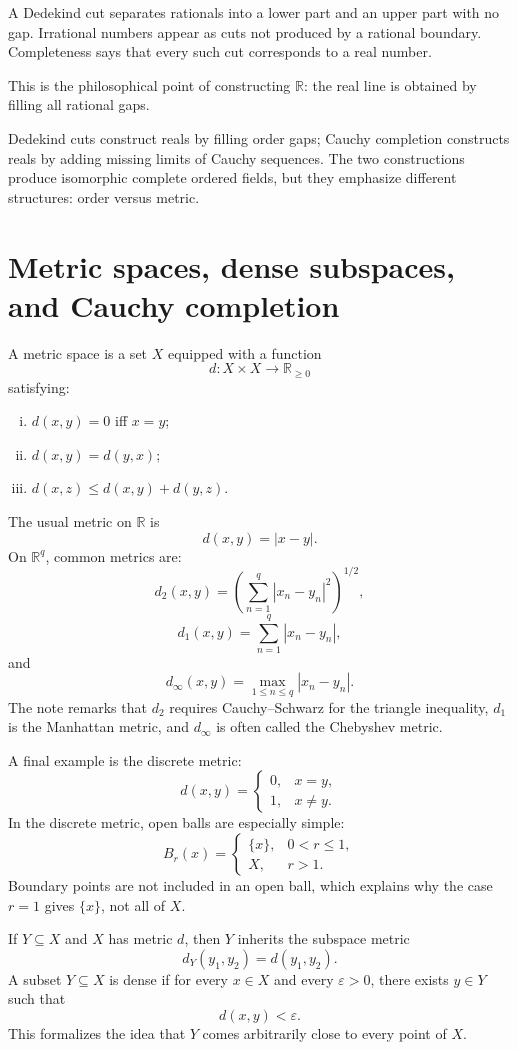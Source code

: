 A Dedekind cut separates rationals into a lower part and an upper part with no gap.  Irrational numbers appear as cuts not produced by a rational boundary.  Completeness says that every such cut corresponds to a real number.

This is the philosophical point of constructing \(\mathbb R\): the real line is obtained by filling all rational gaps.

Dedekind cuts construct reals by filling order gaps; Cauchy completion constructs reals by adding missing limits of Cauchy sequences.  The two constructions produce isomorphic complete ordered fields, but they emphasize different structures: order versus metric.

\section{Metric spaces, dense subspaces, and Cauchy completion}

A metric space is a set \(X\) equipped with a function
\[
  d:X\times X\to\mathbb R_{\ge0}
\]
satisfying:
\begin{enumerate}[(i)]
  \item \(d(x,y)=0\) iff \(x=y\);
  \item \(d(x,y)=d(y,x)\);
  \item \(d(x,z)\le d(x,y)+d(y,z)\).
\end{enumerate}

The usual metric on \(\mathbb R\) is
\[
  d(x,y)=|x-y|.
\]
On \(\mathbb R^q\), common metrics are:
\[
  d_2(x,y)=\left(\sum_{n=1}^q |x_n-y_n|^2\right)^{1/2},
\]
\[
  d_1(x,y)=\sum_{n=1}^q |x_n-y_n|,
\]
and
\[
  d_\infty(x,y)=\max_{1\le n\le q}|x_n-y_n|.
\]
The note remarks that \(d_2\) requires Cauchy--Schwarz for the triangle inequality, \(d_1\) is the Manhattan metric, and \(d_\infty\) is often called the Chebyshev metric.

A final example is the discrete metric:
\[
  d(x,y)=
  \begin{cases}
  0,&x=y,\\
  1,&x\neq y.
  \end{cases}
\]
In the discrete metric, open balls are especially simple:
\[
  B_r(x)=
  \begin{cases}
  \{x\},&0<r\le1,\\
  X,&r>1.
  \end{cases}
\]
Boundary points are not included in an open ball, which explains why the case \(r=1\) gives \(\{x\}\), not all of \(X\).

If \(Y\subseteq X\) and \(X\) has metric \(d\), then \(Y\) inherits the subspace metric
\[
  d_Y(y_1,y_2)=d(y_1,y_2).
\]
A subset \(Y\subseteq X\) is dense if for every \(x\in X\) and every \(\varepsilon>0\), there exists \(y\in Y\) such that
\[
  d(x,y)<\varepsilon.
\]
This formalizes the idea that \(Y\) comes arbitrarily close to every point of \(X\).

